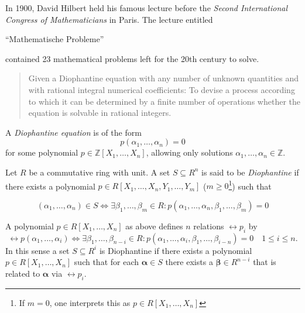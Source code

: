 %

In 1900, David Hilbert held his famous lecture before the \emph{Second
International Congress of Mathematicians} in Paris. The lecture entitled
\begin{german}\enquote{Mathematische Probleme}\end{german} contained 23
mathematical problems left for the 20th century to solve.

\begin{quotation}
    Given a Diophantine equation with any number of unknown quantities and with rational integral numerical coefficients: To devise a process according to which it can be determined by a finite number of operations whether the equation is solvable in rational integers.
\end{quotation}

A \emph{Diophantine equation} is of the form
%
\[ p(α_1, …, α_n) = 0 \]
%
for some polynomial $p ∈ ℤ[X_1, …, X_n]$, allowing only solutions $α_1,…,α_n ∈ ℤ$.


\begin{defin}
    Let $R$ be a commutative ring with unit. A set $S \subseteq R^n$ is said to
    be \emph{Diophantine} if there exists a polynomial $p ∈ R[X_1,…,X_n,
    Y_1,…,Y_m]$ ($m ≥ 0$\footnote{If $m = 0$, one interprets this as $p ∈
    R[X_1,…,X_n]$}) such that

    \[ (α_1,…,α_n) ∈ S \Leftrightarrow ∃ β_1,…,β_m ∈ R: p(α_1,…,α_n,β_1,…,β_m) = 0 \]
\end{defin}

A polynomial $p ∈ R[X_1, …, X_n]$ as above defines $n$ relations $\rel{p}_i$ by
\[
  \rel{p}(α_1, …, α_i)  \Leftrightarrow
   ∃ β_1, …, β_{n - i} ∈ R : p(α_1, …, α_i, β_1, …, β_{i - n}) = 0 \quad
   1 ≤ i ≤ n.
\]
In this sense a set $S \subseteq R^i$ is Diophantine if there exists a
polynomial $p ∈ R[X_1, …, X_n]$ such that for each $\mathbf α ∈ S$ there exists
a $\mathbf β ∈ R^{n - i}$ that is related to $\mathbf α$ via $\rel p_i$.

